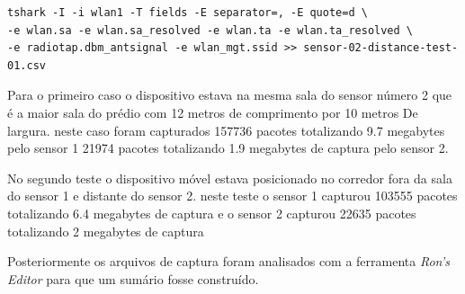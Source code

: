 \begin{verbatim}
tshark -I -i wlan1 -T fields -E separator=, -E quote=d \
-e wlan.sa -e wlan.sa_resolved -e wlan.ta -e wlan.ta_resolved \
-e radiotap.dbm_antsignal -e wlan_mgt.ssid >> sensor-02-distance-test-01.csv
\end{verbatim}

Para o primeiro caso o dispositivo estava na mesma sala do sensor número 2 que é a maior
sala do prédio com 12  metros de comprimento por 10 metros  De largura. neste caso foram
capturados 157736 pacotes totalizando 9.7 megabytes pelo sensor 1 21974 pacotes totalizando
1.9 megabytes de captura pelo sensor 2.

No segundo teste o dispositivo móvel estava posicionado no corredor fora da sala do sensor 1
e distante do sensor 2.  neste teste o sensor 1 capturou 103555 pacotes totalizando 6.4 megabytes
de captura e o sensor 2 capturou 22635 pacotes totalizando 2 megabytes de captura

Posteriormente os arquivos de captura foram analisados com a ferramenta
\emph{Ron’s Editor} para que um sumário fosse construído.


